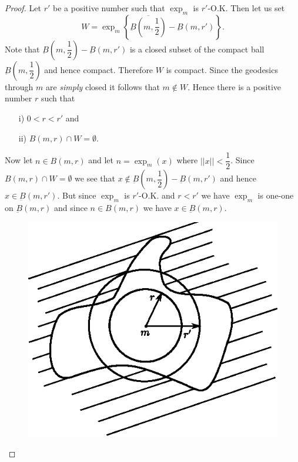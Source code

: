 \begin{proof}
Let \pageoriginale $r'$ be a positive number such that $\exp_{m}$ is 
$r'$-O.K. Then let us set
$$
W=\exp_{m}\left\{\overline{\underbar{B}\left(m,\dfrac{1}{2}\right)}-\underbar{B}(m,r')\right\}.
$$
Note that $\underbar{B}(m,\dfrac{1}{2})-\underbar{B}(m,r')$ is a
closed subset of the compact ball $\underbar{B}(m,\dfrac{1}{2})$ and
hence compact. Therefore $W$ is compact. Since the geo\-desics through
$m$ are {\em simply} closed it follows that $m\not\in W$. Hence there
is a positive number $r$ such that
\begin{itemize}
\item[i)] $0<r<r'$ and

\item[ii)] $B(m,r)\cap W=\emptyset$.
\end{itemize}
Now let $n\in B(m,r)$ and let $n=\exp_{m}(x)$ where
$||x||<\dfrac{1}{2}$. Since $B(m,r)\cap W=\emptyset$ we see that
$x\not\in \underbar{B}(m,\dfrac{1}{2})-\underbar{B}(m,r')$ and hence
$x\in\underbar{B}(m,r')$. But since $\exp_{m}$ is $r'$-O.K. and $r<r'$
we have $\exp_{m}$ is one-one on $\underbar{B}(m,r)$ and since $n\in
B(m,r)$ we have $x\in\underbar{B}(m,r)$.
\begin{figure}[H]
\centering
\includegraphics{figures/chap4-fig2.eps}
\end{figure}
\end{proof}

